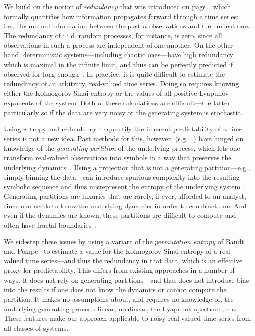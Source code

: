 We build on the notion of \emph{redundancy} that was introduced on
page~\pageref{page:redundancy}, which formally quantifies how
information propagates forward through a time series:
i.e., the mutual information between the past $n$ observations and the
current one.
% 
The redundancy of i.i.d. random processes, for instance, is zero,
since all observations in such a process are independent of one
another.  On the other hand, deterministic systems---including chaotic
ones---have high redundancy which is maximal in the infinite limit, 
and thus can be perfectly predicted if observed for long 
enough~\cite{weigend-book}.  In practice, it is
quite difficult to estimate the redundancy of an arbitrary,
real-valued time series.  Doing so requires knowing either the
Kolmogorov-Sinai entropy or the values of all positive Lyapunov
exponents of the system.  Both of these calculations are
difficult---the latter particularly so if the data are very noisy or
the generating system is stochastic.

Using entropy and redundancy to quantify the inherent predictability
of a time series is not a new idea.  Past methods for this, however,
(e.g.,~\cite{Shannon1951, mantegna1994linguistic}) have hinged on
knowledge of the \emph{generating partition} of the underlying
process, which lets one transform real-valued observations into
symbols in a way that preserves the underlying dynamics~\cite{lind95}.
Using a projection that is not a generating partition---e.g., simply
binning the data---can introduce spurious complexity into the
resulting symbolic sequence and thus misrepresent the entropy of the
underlying system~\cite{bollt2001}.  Generating partitions are
luxuries that are rarely, if ever, afforded to an analyst, since one
needs to know the underlying dynamics in order to construct one.  And
even if the dynamics are known, these partitions are difficult to
compute and often have fractal boundaries~\cite{eisele1999}.

We sidestep these issues by using a variant of the \emph{permutation
  entropy} of Bandt and Pompe~\cite{bandt2002per} to estimate a value
for the Kolmogorov-Sinai entropy of a real-valued time series---and
thus the redundancy in that data, which is an effective proxy for
predictability.  This differs from existing approaches in a number of
ways.  It does not rely on generating partitions---and thus does not
introduce bias into the results if one does not know the dynamics or
cannot compute the partition.  It makes no assumptions about, and
requires no knowledge of, the underlying generating process: linear,
nonlinear, the Lyapunov spectrum, etc.  These features make our
approach applicable to noisy real-valued time series from all classes
of systems.

